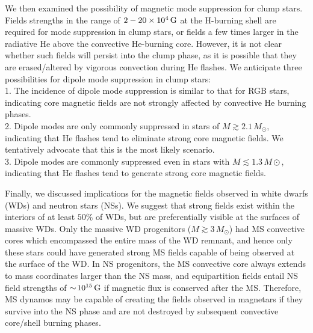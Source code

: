 We then examined the possibility of magnetic mode suppression for clump stars. Fields strengths in the range of $2-20 \times 10^4 \, {\rm G}$ at the H-burning shell are required for mode suppression in clump stars, or fields a few times larger in the radiative He above the convective He-burning core. However, it is not clear whether such fields will persist into the clump phase, as it is possible that they are erased/altered by vigorous convection during He flashes. We anticipate three possibilities for dipole mode suppression in clump stars:\\
1. The incidence of dipole mode suppression is similar to that for RGB stars, indicating core magnetic fields are not strongly affected by convective He burning phases. \\
2. Dipole modes are only commonly suppressed in stars of $M \gtrsim 2.1 \, M_\odot$, indicating that He flashes tend to eliminate strong core magnetic fields. We tentatively advocate that this is the most likely scenario. \\
3. Dipole modes are commonly suppressed even in stars with $M \lesssim 1.3 \, M\odot$, indicating that He flashes tend to generate strong core magnetic fields.



Finally, we discussed implications for the magnetic fields observed in white dwarfs (WDs) and neutron stars (NSs). We suggest that strong fields exist within the interiors of at least $50 \%$ of WDs, but are preferentially visible at the surfaces of massive WDs. Only the massive WD progenitors ($M \gtrsim 3 \, M_\odot$) had MS convective cores which encompassed the entire mass of the WD remnant, and hence only these stars could have generated strong MS fields capable of being observed at the surface of the WD. In NS progenitors, the MS convective core always extends to mass coordinates larger than the NS mass, and equipartition fields entail NS field strengths of $\sim \! 10^{15} \, {\rm G}$ if magnetic flux is conserved after the MS. Therefore, MS dynamos may be capable of creating the fields observed in magnetars if they survive into the NS phase and are not destroyed by subsequent convective core/shell burning phases. 
  
  
  
  
  
  
  
  
  
  
  